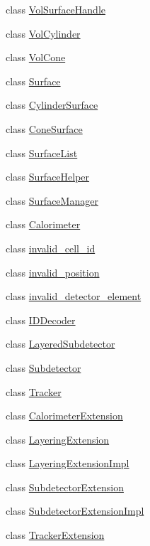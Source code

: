 \begin{DoxyCompactItemize}
\item 
class \hyperlink{class_d_d4hep_1_1_d_d_rec_1_1_vol_surface_handle}{VolSurfaceHandle}
\item 
class \hyperlink{class_d_d4hep_1_1_d_d_rec_1_1_vol_cylinder}{VolCylinder}
\item 
class \hyperlink{class_d_d4hep_1_1_d_d_rec_1_1_vol_cone}{VolCone}
\item 
class \hyperlink{class_d_d4hep_1_1_d_d_rec_1_1_surface}{Surface}
\item 
class \hyperlink{class_d_d4hep_1_1_d_d_rec_1_1_cylinder_surface}{CylinderSurface}
\item 
class \hyperlink{class_d_d4hep_1_1_d_d_rec_1_1_cone_surface}{ConeSurface}
\item 
class \hyperlink{class_d_d4hep_1_1_d_d_rec_1_1_surface_list}{SurfaceList}
\item 
class \hyperlink{class_d_d4hep_1_1_d_d_rec_1_1_surface_helper}{SurfaceHelper}
\item 
class \hyperlink{class_d_d4hep_1_1_d_d_rec_1_1_surface_manager}{SurfaceManager}
\item 
class \hyperlink{class_d_d4hep_1_1_d_d_rec_1_1_calorimeter}{Calorimeter}
\item 
class \hyperlink{class_d_d4hep_1_1_d_d_rec_1_1invalid__cell__id}{invalid\_\-cell\_\-id}
\item 
class \hyperlink{class_d_d4hep_1_1_d_d_rec_1_1invalid__position}{invalid\_\-position}
\item 
class \hyperlink{class_d_d4hep_1_1_d_d_rec_1_1invalid__detector__element}{invalid\_\-detector\_\-element}
\item 
class \hyperlink{class_d_d4hep_1_1_d_d_rec_1_1_i_d_decoder}{IDDecoder}
\item 
class \hyperlink{class_d_d4hep_1_1_d_d_rec_1_1_layered_subdetector}{LayeredSubdetector}
\item 
class \hyperlink{class_d_d4hep_1_1_d_d_rec_1_1_subdetector}{Subdetector}
\item 
class \hyperlink{class_d_d4hep_1_1_d_d_rec_1_1_tracker}{Tracker}
\item 
class \hyperlink{class_d_d4hep_1_1_d_d_rec_1_1_calorimeter_extension}{CalorimeterExtension}
\item 
class \hyperlink{class_d_d4hep_1_1_d_d_rec_1_1_layering_extension}{LayeringExtension}
\item 
class \hyperlink{class_d_d4hep_1_1_d_d_rec_1_1_layering_extension_impl}{LayeringExtensionImpl}
\item 
class \hyperlink{class_d_d4hep_1_1_d_d_rec_1_1_subdetector_extension}{SubdetectorExtension}
\item 
class \hyperlink{class_d_d4hep_1_1_d_d_rec_1_1_subdetector_extension_impl}{SubdetectorExtensionImpl}
\item 
class \hyperlink{class_d_d4hep_1_1_d_d_rec_1_1_tracker_extension}{TrackerExtension}
\end{DoxyCompactItemize}
